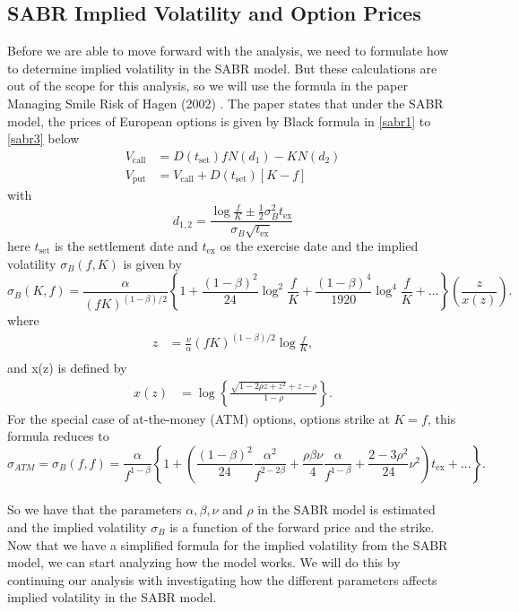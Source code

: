\subsection{SABR Implied Volatility and Option Prices}
Before we are able to move forward with the analysis,
we need to formulate how to determine implied volatility in the SABR model. 
But these calculations are out of the scope for this analysis,
so we will use the formula in the paper Managing Smile Risk 
of Hagen (2002) \cite{Smile}. The paper states that
under the SABR model, the prices of European options 
is given by Black formula in \autoref{sabr1} to \autoref{sabr3}
below
\begin{align}
    V_{\text{call}} &= D(t_{\text{set}})fN(d_1) - KN(d_2)  \label{sabr1}\\
    V_{\text{put}} &= V_{\text{call}} + D(t_{\text{set}})[K - f] \label{sabr2}
\end{align}
with
\begin{equation}
    d_{1,2} = \frac{\log \frac{f}{K} \pm \frac{1}{2}\sigma_B^2 t_{\text{ex}}}{\sigma_B \sqrt{t_{\text{ex}}}}
     \label{sabr3}
\end{equation}
here $t_{\text{set}}$ is the settlement date and $t_{\text{ex}}$ os the exercise date and 
the implied volatility $\sigma_B(f, K)$ is given by
\begin{equation}
    \sigma_B(K, f) = \frac{\alpha}{(fK)^{(1-\beta)/2}} \left\{ 1 + \frac{(1-\beta)^2}{24} \log^2 \frac{f}{K} + \frac{(1-\beta)^4}{1920} \log^4 \frac{f}{K} + \ldots \right\} \left( \frac{z}{x(z)} \right).
    \label{sigma_B}
\end{equation}
where
\begin{align}
    z &= \frac{\nu}{\alpha}(fK)^{(1-\beta)/2} \log \frac{f}{K}, \\
\end{align}
and x(z) is defined by
\begin{align}
    x(z) &= \log \left\{ \frac{\sqrt{1-2\rho z + z^2} + z - \rho}{1 - \rho} \right\}.
\end{align}
For the special case of at-the-money (ATM) options, options strike at $K = f$, this formula reduces to
\begin{equation}
    \sigma_{ATM} = \sigma_B(f, f) = \frac{\alpha}{f^{1-\beta}} \left\{ 1 + \left( \frac{(1-\beta)^2}{24} \frac{\alpha^2}{f^{2-2\beta}} + \frac{\rho \beta \nu}{4} \frac{\alpha}{f^{1-\beta}} + \frac{2-3\rho^2}{24} \nu^2 \right) t_{\text{ex}} + \ldots \right\}.
    \label{sigma_ff}
\end{equation}
\\
So we have that the parameters $\alpha, \beta, \nu$ and $\rho$  in the SABR model is estimated and the implied volatility $\sigma_B$
is a function of the forward price and the strike. Now that we have a simplified formula for the implied 
volatility from the SABR model, we can start analyzing 
how the model works. We will do this by continuing our
analysis with investigating how the different parameters 
affects implied volatility in the SABR model. 

